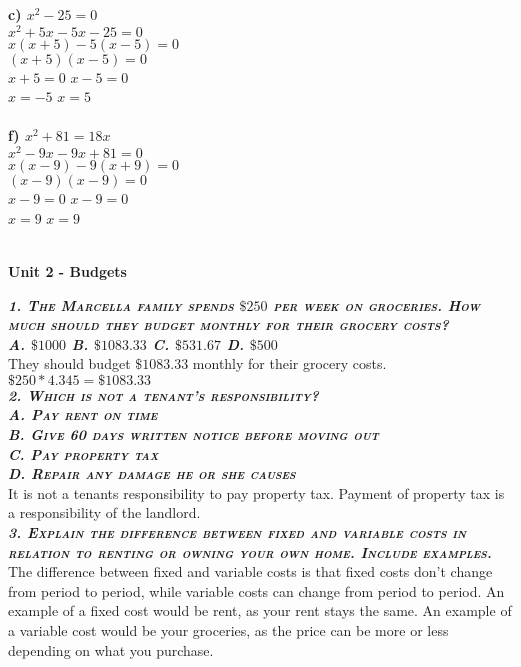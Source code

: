 \documentclass{article}
\begin{document}
\begin{multicols}{3}
    \textbf{c) $x^2-25=0$}\\
    $x^2+5x-5x-25=0$ \\
    $x(x+5)-5(x-5)=0$ \\
    $(x+5)(x-5)=0$ \\
    $x+5=0$ \hspace{0.45cm} $x-5=0$ \\
    $x=-5$ \hspace{1cm} $x=5$ \\ \\
    \textbf{f) $x^2+81=18x$} \\ 
    $x^2-9x-9x+81=0$ \\
    $x(x-9)-9(x+9)=0$ \\
    $(x-9)(x-9)=0$ \\
    $x-9=0$ \hspace{0.45cm} $x-9=0$ \\
    $x=9$ \hspace{1cm} $x=9$ \\ \\
\end{multicols}

\newpage

\textbf{{\huge Unit 2 - Budgets}}

\textbf{\emph{\textsc{1. The Marcella family spends $\$250$ per week on groceries. How much should they budget monthly for their grocery costs? \\
A. $\$1000$ B. $\$1083.33$ C. $\$531.67$ D. $\$500$}}} \\
They should budget $\$1083.33$ monthly for their grocery costs. \\
$\$250*4.345=\$1083.33$ \\

\textbf{\emph{\textsc{2. Which is not a tenant's responsibility? \\
A. Pay rent on time  \\B. Give 60 days written notice before moving out \\C. Pay property tax \\D. Repair any damage he or she causes\\}}}
It is not a tenants responsibility to pay property tax. Payment of property tax is a responsibility of the landlord. \\

\textbf{\emph{\textsc{3. Explain the difference between fixed and variable costs in relation to renting or owning your own home. Include examples.}}} \\
The difference between fixed and variable costs is that fixed costs don't change from period to period, while variable costs can change from period to period. An example of a fixed cost would be rent, as your rent stays the same. An example of a variable cost would be your groceries, as the price can be more or less depending on what you purchase. \\
\end{document}
